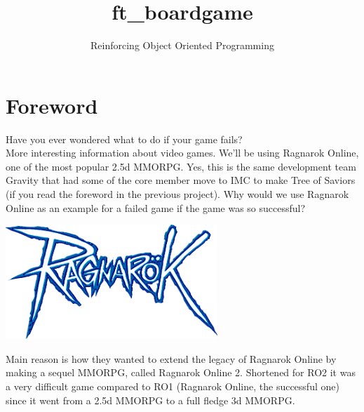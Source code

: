 \documentclass{42-en}
\begin{document}
                           \title{ft\_boardgame}
                          \subtitle{Reinforcing Object Oriented Programming}

\maketitle

\tableofcontents


\chapter{Foreword}

	Have you ever wondered what to do if your game fails?\\

	More interesting information about video games. We'll be using Ragnarok Online,
	one of the most popular 2.5d MMORPG. Yes, this is the same development team
	Gravity that had some of the core member move to IMC to make Tree of Saviors
	(if you read the foreword in the previous project). Why would we use Ragnarok
	Online as an example for a failed game if the game was so successful?

	\begin{center}
		\includegraphics[width=0.6\textwidth]{images/ragnarok.png}
	\end{center}

	Main reason is how they wanted to extend the legacy of Ragnarok Online by making
	a sequel MMORPG, called Ragnarok Online 2. Shortened for RO2 it was a very
	difficult game compared to RO1 (Ragnarok Online, the successful one) since it went
	from a 2.5d MMORPG to a full fledge 3d MMORPG.\\
\end{document}
